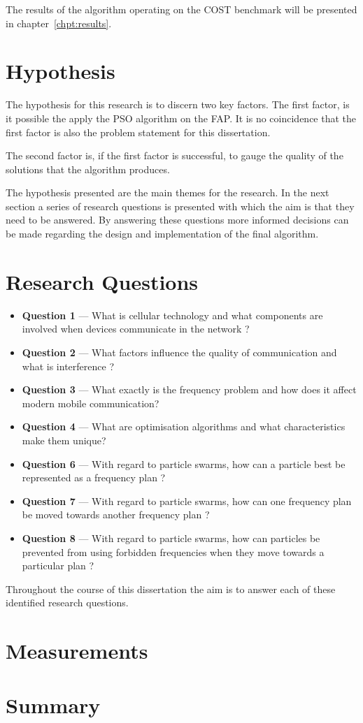 The results of the algorithm operating on the \gls{COST} benchmark will be presented in chapter~\ref{chpt:results}. 
\section{Hypothesis}
The hypothesis for this research is to discern two key factors. The first factor, is it possible the apply the \gls{PSO} algorithm on the \gls{FAP}. It is no coincidence that the first factor is also the problem statement for this dissertation.

The second factor is, if the first factor is successful, to gauge the quality of the solutions that the algorithm produces.

The hypothesis presented are the main themes for the research. In the next section a series of research questions is presented with which the aim is that they need to be answered. By answering these questions more informed decisions can be made regarding the design and implementation of the final algorithm.
\section{Research Questions}
\begin{itemize}
\item \textbf{Question 1} --- What is cellular technology and what components are involved when devices communicate in the network ?
\item \textbf{Question 2} --- What factors influence the quality of communication and what is interference ?
\item \textbf{Question 3} --- What exactly is the frequency problem and how does it affect modern mobile communication?
\item \textbf{Question 4} --- What are optimisation algorithms and what characteristics make them unique?
\item \textbf{Question 6} --- With regard to particle swarms, how can a particle best be represented as a frequency plan ?
\item \textbf{Question 7} --- With regard to particle swarms, how can one frequency plan be moved towards another frequency plan ?
\item \textbf{Question 8} --- With regard to particle swarms, how can particles be prevented from using forbidden frequencies when they move towards a particular plan ?
\end{itemize}

Throughout the course of this dissertation the aim is to answer each of these identified research questions. 

\section{Measurements}
\section{Summary}

